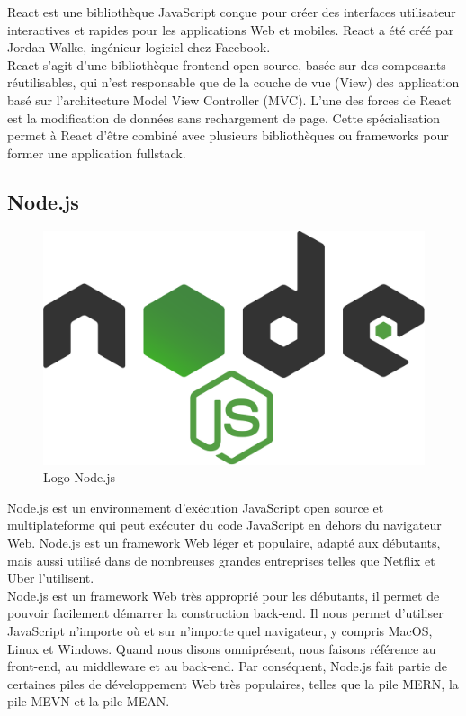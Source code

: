     React\cite{react} est une bibliothèque JavaScript conçue pour créer des interfaces utilisateur interactives et rapides pour les applications Web et mobiles. React a été créé par Jordan Walke, ingénieur logiciel chez Facebook.\\
    
    React s'agit d'une bibliothèque frontend open source, basée sur des composants réutilisables, qui n'est responsable que de la couche de vue (View) des application basé sur l'architecture Model View Controller (\acs{MVC}). L'une des forces de React est la modification de données sans rechargement de page. Cette spécialisation permet à React d'être combiné avec plusieurs bibliothèques ou frameworks pour former une application fullstack.\\

    \subsection{Node.js}
    \begin{figure}[H]
        \centering
        \includegraphics[scale=0.1]{ACR/nodejs-logo.png}
        \caption{Logo Node.js}
    \end{figure}

    Node.js\cite{nodejs} est un environnement d'exécution JavaScript open source et multiplateforme qui peut exécuter du code JavaScript en dehors du navigateur Web. Node.js est un framework Web léger et populaire, adapté aux débutants, mais aussi utilisé dans de nombreuses grandes entreprises telles que Netflix et Uber l'utilisent.\\
    
    Node.js est un framework Web très approprié pour les débutants, il permet de pouvoir facilement démarrer la construction back-end. Il nous permet d'utiliser JavaScript n'importe où et sur n'importe quel navigateur, y compris MacOS, Linux et Windows. Quand nous disons omniprésent, nous faisons référence au front-end, au middleware et au back-end. Par conséquent, Node.js fait partie de certaines piles de développement Web très populaires, telles que la pile \acs{MERN}, la pile \acs{MEVN} et la pile \acs{MEAN}.\\

